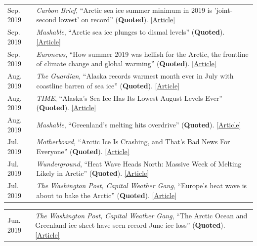 \documentclass[margin,line,palatino,courier,10pt]{res}
\begin{document}
\begin{resume}
\begin{tabular}{@{}p{0.9in}p{4in}}
Sep. 2019 & \textit{Carbon Brief}, ``Arctic sea ice summer minimum in 2019 is 'joint-second lowest' on record'' (\textbf{Quoted}). \href{https://www.carbonbrief.org/arctic-sea-ice-minimum-in-2019-is-joint-second-lowest-on-record}{[Article]}\\
Sep. 2019 & \textit{Mashable}, ``Arctic sea ice plunges to dismal levels'' (\textbf{Quoted}). \href{https://mashable.com/article/arctic-sea-ice-2019-melt/}{[Article]}\\
Sep. 2019 & \textit{Euronews}, ``How summer 2019 was hellish for the Arctic, the frontline of climate change and global warming'' (\textbf{Quoted}). \href{https://www.euronews.com/2019/09/18/how-2019-was-hellish-for-the-arctic-the-frontline-of-climate-change-and-global-warming}{[Article]}\\
Aug. 2019 & \textit{The Guardian}, ``Alaska records warmest month ever in July with coastline barren of sea ice'' (\textbf{Quoted}). \href{https://www.theguardian.com/us-news/2019/aug/08/alaska-warmest-month-ever-july-2019-sea-ice}{[Article]}\\
Aug. 2019 & \textit{TIME}, ``Alaska's Sea Ice Has Its Lowest August Levels Ever'' (\textbf{Quoted}). \href{https://time.com/5646168/alaska-sea-ice-melted/}{[Article]}\\
Aug. 2019 & \textit{Mashable}, ``Greenland's melting hits overdrive'' (\textbf{Quoted}). \href{https://mashable.com/article/greenland-melting-spike-climate-change/}{[Article]}\\
Jul. 2019 & \textit{Motherboard}, ``Arctic Ice Is Crashing, and That's Bad News For Everyone'' (\textbf{Quoted}). \href{https://www.vice.com/en_us/article/qv7gzm/arctic-ice-is-crashing-and-thats-bad-news-for-everyone}{[Article]}\\
Jul. 2019 & \textit{Wunderground}, ``Heat Wave Heads North: Massive Week of Melting Likely in Arctic'' (\textbf{Quoted}). \href{https://www.wunderground.com/cat6/Heat-Wave-Heads-North-Massive-Week-Melting-Likely-Arctic}{[Article]}\\
Jul. 2019 & \textit{The Washington Post, Capital Weather Gang}, ``Europe's heat wave is about to bake the Arctic'' (\textbf{Quoted}). \href{https://www.washingtonpost.com/weather/2019/07/26/europes-heat-wave-is-about-bake-arctic/?utm_term=.f57032deb299}{[Article]}\\
\end{tabular}
\begin{tabular}{@{}p{0.9in}p{4in}}
Jun. 2019 & \textit{The Washington Post, Capital Weather Gang}, ``The Arctic Ocean and Greenland ice sheet have seen record June ice loss'' (\textbf{Quoted}). \href{https://www.washingtonpost.com/weather/2019/06/14/arctic-ocean-greenland-ice-sheet-have-seen-record-june-ice-loss/?utm_term=.7539db99ca6e}{[Article]}\\

\end{tabular}
\end{resume}
\end{document}
